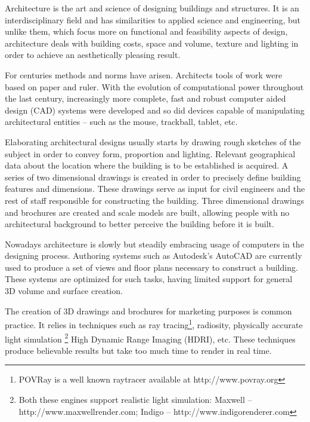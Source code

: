 
Architecture is the art and science of designing buildings and structures.
It is an interdisciplinary field and has similarities to applied science and
engineering, but unlike them, which focus more on functional and feasibility aspects of design, 
architecture deals with building costs, space and volume, texture and lighting
in order to achieve an aesthetically pleasing result.

For centuries methods and norms have arisen. Architects tools of work were based on paper and ruler.
With the evolution of computational power throughout the last century, 
increasingly more complete, fast and robust computer aided design (CAD) systems were developed and so did
devices capable of manipulating architectural entities -- such as the mouse, trackball, tablet, etc.

Elaborating architectural designs usually starts by drawing rough sketches of the subject
in order to convey form, proportion and lighting. Relevant geographical data about the location
where the building is to be established is acquired. A series of two dimensional drawings is created
in order to precisely define building features and dimensions.
These drawings serve as input for civil engineers and the rest of staff responsible for constructing the building.
Three dimensional drawings and brochures are created and scale models are built, allowing
people with no architectural background to better perceive the building before it is built.

Nowadays architecture is slowly but steadily embracing usage of computers in the designing process.
Authoring systems such as Autodesk's AutoCAD
\cite{SITE-AUTOCAD}
are currently used to produce a set of views and floor plans necessary to construct a building.
These systems are optimized for such tasks, having limited support for general 3D volume and surface creation.

The creation of 3D drawings and brochures for marketing purposes is common practice.
It relies in techniques such as
ray tracing\footnote{POVRay is a well known raytracer available at http://www.povray.org}\nocite{SITE-POVRAY},
radiosity,
physically accurate light simulation
\footnote{Both these engines support realistic light simulation:
Maxwell -- http://www.maxwellrender.com\nocite{SITE-MAXWELL};
Indigo -- http://www.indigorenderer.com\nocite{SITE-INDIGO}
}
High Dynamic Range Imaging (HDRI), etc.
These techniques produce believable results but take too much time to render in real time.

